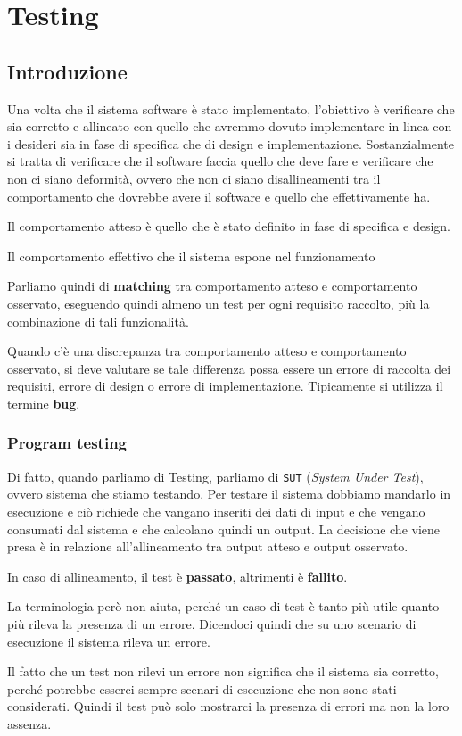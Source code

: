 \chapter{Testing}
\section{Introduzione}
Una volta che il sistema software è stato implementato, l'obiettivo è
verificare che sia corretto e allineato con quello che avremmo dovuto implementare 
in linea con i desideri sia in fase di specifica che di design e implementazione.
Sostanzialmente si tratta di verificare che il software faccia quello che deve fare e
verificare che non ci siano deformità, ovvero che non ci siano disallineamenti tra il comportamento 
che dovrebbe avere il software e quello che effettivamente ha.
\begin{tcolorbox}[title={Comportamento atteso}]
    Il comportamento atteso è quello che è stato definito in fase di specifica e design.
\end{tcolorbox}
\begin{tcolorbox}[title={Comportamento osservato}]
    Il comportamento effettivo che il sistema espone nel funzionamento
\end{tcolorbox}
Parliamo quindi di \textbf{matching} tra comportamento atteso e
comportamento osservato, eseguendo quindi almeno un test per ogni requisito raccolto,
più la combinazione di tali funzionalità.

Quando c'è una discrepanza tra comportamento atteso e comportamento osservato, 
si deve valutare se tale differenza possa essere un errore di raccolta dei requisiti,
errore di design o errore di implementazione. Tipicamente si utilizza il termine 
\textbf{bug}.
\subsection{Program testing}
Di fatto, quando parliamo di Testing, parliamo di \texttt{SUT} (\textit{System Under Test}),
ovvero sistema che stiamo testando. Per testare il sistema dobbiamo mandarlo 
in esecuzione e ciò richiede che vangano inseriti dei dati di input e che vengano 
consumati dal sistema e che calcolano quindi un output. La decisione che viene presa è 
in relazione all'allineamento tra output atteso e output osservato.
\begin{tcolorbox}
    In caso di allineamento, il test è \textbf{passato}, altrimenti è \textbf{fallito}.
\end{tcolorbox}
La terminologia però non aiuta, perché un caso di test è tanto più utile quanto più
rileva la presenza di un errore. Dicendoci quindi che su uno scenario di esecuzione 
il sistema rileva un errore.
\begin{nota}
    Il fatto che un test non rilevi un errore non significa che il sistema sia corretto,
    perché potrebbe esserci sempre scenari di esecuzione che non sono stati considerati.
    Quindi il test può solo mostrarci la presenza di errori ma non la loro assenza.
\end{nota}
